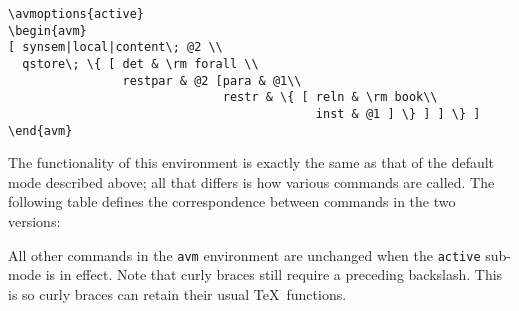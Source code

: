 \begin{example}
{\obeyspaces\begin{verbatim}
\avmoptions{active}
\begin{avm}
[ synsem|local|content\; @2 \\
  qstore\; \{ [ det & \rm forall \\
                restpar & @2 [para & @1\\
                              restr & \{ [ reln & \rm book\\
                                           inst & @1 ] \} ] ] \} ]
\end{avm}
\end{verbatim}}
\end{example}
%

The functionality of this environment is exactly the same as that of
the default mode described above; all that differs is how various commands
are called.  The following table defines the correspondence between
commands in the two versions:
%
%
All other commands in the \verb+avm+ environment are unchanged when
the \verb+active+ sub-mode is in effect.  Note that curly braces
still require a preceding backslash.  This is so curly braces can retain
their usual \TeX\ functions. 

